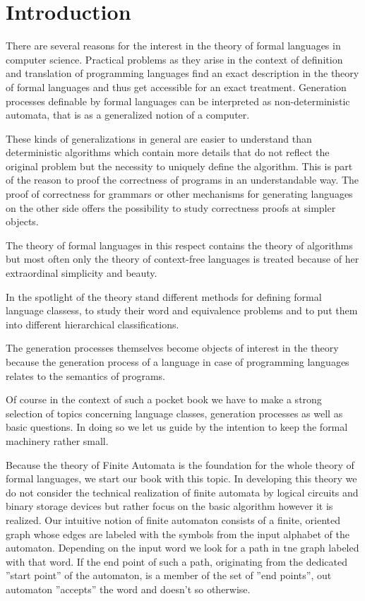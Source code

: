 \chapter{Introduction}

There are several reasons for the interest in the theory of formal languages in
computer science. Practical problems as they arise in the context of definition
and translation of programming languages find an exact description in the theory
of formal languages and thus get accessible for an exact treatment. Generation
processes definable by formal languages can be interpreted as non-deterministic
automata, that is as a generalized notion of a computer.

These kinds of generalizations in general are easier to understand than
deterministic algorithms which contain more details that do not reflect the
original problem but the necessity to uniquely define the algorithm. This is
part of the reason to proof the correctness of programs in an understandable
way. The proof of correctness for grammars or other mechanisms for generating
languages on the other side offers the possibility to study correctness proofs
at simpler objects.

The theory of formal languages in this respect contains the theory of
algorithms but most often only the theory of context-free languages is treated
because of her extraordinal simplicity and beauty.

In the spotlight of the theory stand different methods for defining formal
language classess, to study their word and equivalence problems and to
put them into different hierarchical classifications.

The generation processes themselves become objects of interest in the theory
because the generation process of a language in case of programming languages
relates to the semantics of programs.

Of course in the context of such a pocket book we have to make a strong
selection of topics concerning language classes, generation processes as well as
basic questions. In doing so we let us guide by the intention to keep the formal
machinery rather small.

Because the theory of Finite Automata is the foundation for the whole theory of
formal languages, we start our book with this topic. In developing this theory
we do not consider the technical realization of finite
automata by logical circuits and binary storage devices but rather focus on the
basic algorithm however it is realized. Our intuitive notion of finite automaton
consists of a finite, oriented graph whose edges are labeled with the symbols
from the input alphabet of the automaton. Depending on the input word we look
for a path in tne graph labeled with that word. If the end point of such a path,
originating from the dedicated ''start point'' of the automaton, is a member of
the set of ''end points'', out automaton ''accepts'' the word and doesn't so
otherwise.

